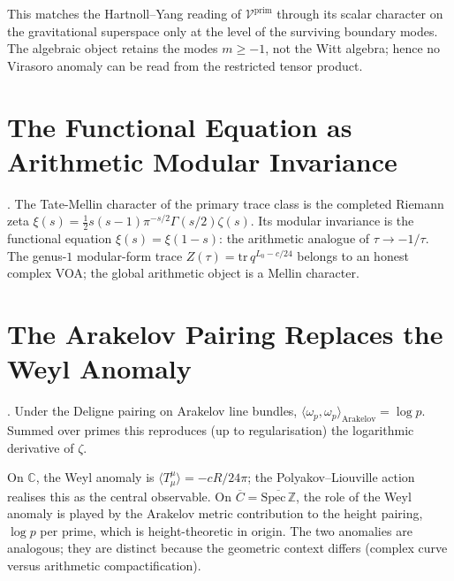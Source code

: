 \begin{remark}
This matches the Hartnoll--Yang reading of
\(\mathcal{V}^{\mathrm{prim}}\) through its scalar character on the
gravitational superspace only at the level of the surviving boundary
modes. The algebraic object retains the modes \(m\geq -1\), not the
Witt algebra; hence no Virasoro anomaly can be read from the restricted
tensor product.
\end{remark}

\section{The Functional Equation as Arithmetic Modular Invariance}
\label{v4-arith:pol:functional-equation-modular}

\begin{theorem}
\label{v4-arith:thm:arithmetic-modular-invariance}
\ClaimStatusProvedHere. The Tate-Mellin character of the primary trace
class is the completed Riemann zeta
\(\xi(s)=\tfrac{1}{2}s(s-1)\pi^{-s/2}\Gamma(s/2)\zeta(s)\).
Its modular invariance is the functional equation \(\xi(s)=\xi(1-s)\):
the arithmetic analogue of \(\tau\to-1/\tau\).
The genus-\(1\) modular-form trace \(Z(\tau)=\mathrm{tr}\,q^{L_{0}-c/24}\)
belongs to an honest complex VOA; the global arithmetic object is a
Mellin character.
\end{theorem}

\section{The Arakelov Pairing Replaces the Weyl Anomaly}
\label{v4-arith:pol:arakelov-pairing}

\begin{proposition}[Deligne pairing = Weyl anomaly analogue]
\label{v4-arith:prop:deligne-pairing}
\ClaimStatusProvedElsewhere. Under the Deligne pairing on Arakelov
line bundles, \(\langle\omega_{p},\omega_{p}\rangle_{\mathrm{Arakelov}}=\log p\).
Summed over primes this reproduces (up to regularisation) the
logarithmic derivative of \(\zeta\).
\end{proposition}

\begin{remark}
On \(\mathbb{C}\), the Weyl anomaly is \(\langle T^{\mu}_{\mu}\rangle=-cR/24\pi\);
the Polyakov--Liouville action realises this as the central observable.
On \(\overline{C}=\overline{\mathrm{Spec}\,\mathbb{Z}}\), the role of
the Weyl anomaly is played by the Arakelov metric contribution to the
height pairing, \(\log p\) per prime, which is height-theoretic in origin.
The two anomalies are analogous; they are distinct because the geometric
context differs (complex curve versus arithmetic compactification).
\end{remark}

